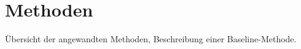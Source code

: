 \chapter{Methoden} \label{chapter:2}
Übersicht der angewandten Methoden, Beschreibung einer Baseline-Methode.
